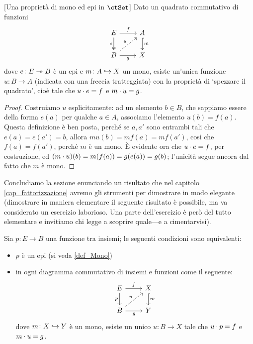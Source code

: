 \begin{proposition}\label{mono_epi_ort}[Una proprietà di mono ed epi in \(\ctSet\)]
 Dato un quadrato commutativo di funzioni
 \[\begin{tikzcd}
   E \ar[r,"f"]\ar[d, two heads, "e"']& A\ar[d, hook, "m"] \\
   B \ar[r, "g"']\ar[ur,dashed,"u"] & X
  \end{tikzcd}\]
 dove \(e \colon E\twoheadrightarrow B\) è un epi e \(m \colon A \hookrightarrow X\) un mono, esiste un'unica funzione \(u \colon B\to A\) (indicata con una freccia tratteggiata) con la proprietà di `spezzare il quadrato', cioè tale che \(u\cdot e=f\) e \(m\cdot u=g\).
\end{proposition}
\begin{proof}
 Costruiamo \(u\) esplicitamente: ad un elemento \(b\in B\), che sappiamo essere della forma \(e(a)\) per qualche \(a\in A\), associamo l'elemento \(u(b)=f(a)\). Questa definizione è ben posta, perché se \(a,a'\) sono entrambi tali che \(e(a)=e(a')=b\), allora \(mu(b)=mf(a)=mf(a')\), così che \(f(a)=f(a')\), perché \(m\) è un mono. È evidente ora che \(u\cdot e= f\), per costruzione, ed \((m\cdot u)(b)=m(f(a))=g(e(a))=g(b)\); l'unicità segue ancora dal fatto che \(m\) è mono.
\end{proof}
Concludiamo la sezione enunciando un risultato che nel capitolo \ref{cap_fattorizzazione} avremo gli strumenti per dimostrare in modo elegante (dimostrare in maniera elementare il seguente risultato è possibile, ma va considerato un esercizio laborioso. Una parte dell'esercizio è però del tutto elementare e invitiamo chi legge a scoprire quale---e a cimentarvisi).
\begin{proposition}\label{caratt_epi_con_ort}
 Sia \(p \colon E \to B\) una funzione tra insiemi; le seguenti condizioni sono equivalenti:
 \begin{itemize}
  \item \(p\) è un epi (si veda \ref{def_Mono})
  \item in ogni diagramma commutativo di insiemi e funzioni come il seguente:
        \[\begin{tikzcd}
          E \ar[r, "f"]\ar[d, "p"']& X \ar[d,hook, "m"]\\
          B \ar[r, "g"'] \ar[ur, dashed, "u"]& Y
         \end{tikzcd}\]
        dove \(m \colon X\hookrightarrow Y\) è un mono, esiste un unico \(u \colon B\to X\) tale che \(u\cdot p = f\) e \(m\cdot u = g\).
 \end{itemize}
\end{proposition}
